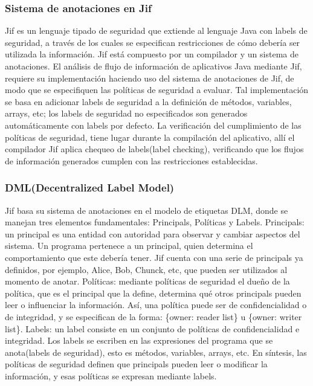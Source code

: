 \subsubsection{Sistema de anotaciones en Jif}
Jif es un lenguaje tipado de seguridad que extiende al lenguaje Java con labels
de seguridad, a través de los cuales se especifican restricciones de cómo
debería ser utilizada la información. Jif está compuesto por un compilador y un
sistema de anotaciones.\newline
El análisis de flujo de información de aplicativos Java mediante Jif, requiere
su implementación haciendo uso del sistema de anotaciones de Jif, de modo que se
especifiquen las políticas de seguridad a evaluar.
Tal implementación se basa en adicionar labels de seguridad a la definición
de métodos, variables, arrays, etc; los labels de seguridad no especificados son
generados automáticamente con labels por defecto.\newline
La verificación del cumplimiento de las políticas de seguridad, tiene lugar
durante la compilación del aplicativo, allí el compilador Jif aplica chequeo de
labels(label checking)\cite{jifRef},  verificando que los flujos de información
generados cumplen con las restricciones establecidas.

\subsubsection{DML(Decentralized Label Model)}
Jif basa su sistema de anotaciones en el modelo de etiquetas DLM, donde se
manejan tres elementos fundamentales: Principals, Políticas y Labels.\newline
Principals: un principal es una entidad con autoridad para observar y cambiar
aspectos del sistema. Un programa pertenece a un principal, quien determina el
comportamiento que este debería tener. Jif cuenta con una serie de principals ya
definidos, por ejemplo, Alice, Bob, Chunck, etc, que pueden ser
utilizados al momento de anotar.\newline 
Políticas: mediante políticas de seguridad el dueño de la política, que es el
principal que la define, determina qué otros principals pueden leer o
influenciar la información. Así, una política puede ser de confidencialidad o de
integridad, y se especifican de la forma: \{owner: reader list\} u
\{owner: writer list\}.\newline 
Labels: un label consiste en un conjunto de políticas de confidencialidad e
integridad. Los labels se escriben en las expresiones del programa que se
anota(labels de seguridad), esto es métodos, variables, arrays, etc.\newline 
En síntesis, las políticas de seguridad definen que principals pueden leer o
modificar la información, y esas políticas se expresan mediante labels.


